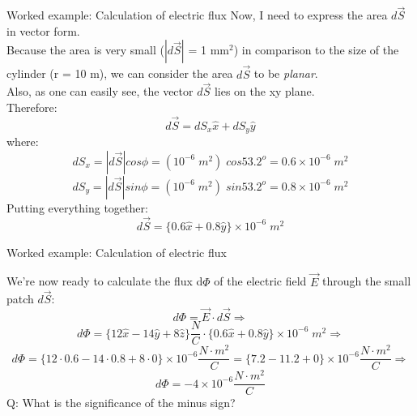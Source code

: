{\begin{frame}{Worked example: Calculation of electric flux}
Now, I need to express the area $d\vec{S}$ in vector form.\\
\vspace{0.2cm}
Because the area is very small ($|d\vec{S}|$ = 1 mm$^2$) in comparison to the
size of the cylinder (r = 10 m), we can consider the area $d\vec{S}$ to be {\em planar}.\\
\vspace{0.1cm}
Also, as one can easily see, the vector $d\vec{S}$ lies on the xy plane.\\
\vspace{0.3cm}
Therefore:
\begin{equation*}
  d\vec{S} = dS_x \hat{x} + dS_y \hat{y}
\end{equation*}
where:
\begin{equation*}
   dS_x = |d\vec{S}| cos\phi = (10^{-6} \; m^2) \; cos53.2^o = 0.6 \times 10^{-6} \; m^2
\end{equation*}
\begin{equation*}
   dS_y = |d\vec{S}| sin\phi = (10^{-6} \; m^2) \; sin53.2^o = 0.8 \times 10^{-6} \; m^2
\end{equation*}
\vspace{0.2cm}
Putting everything together:
\begin{equation*}
  d\vec{S} = \big\{ 0.6 \hat{x} + 0.8 \hat{y} \big\} \times 10^{-6} \; m^2
\end{equation*}

\end{frame}

%
%
%

\begin{frame}{Worked example: Calculation of electric flux}

We're now ready to calculate the flux d$\Phi$ of the electric field $\vec{E}$
through the small patch $d\vec{S}$:\\
\vspace{0.2cm}
\begin{equation*}
  d\Phi = \vec{E} \cdot d\vec{S} \Rightarrow
\end{equation*}
\vspace{0.1cm}
\begin{equation*}
  d\Phi =
  \big\{ 12 \hat{x} - 14 \hat{y} + 8 \hat{z} \big\} \frac{N}{C}
   \cdot \big\{ 0.6 \hat{x} + 0.8 \hat{y} \big\} \times 10^{-6} \; m^2 \Rightarrow
\end{equation*}
\vspace{0.1cm}
\begin{equation*}
  d\Phi =
  \big\{ 12 \cdot 0.6 - 14 \cdot 0.8 + 8 \cdot 0 \big\} \times 10^{-6} \frac{N \cdot m^2}{C} =
  \big\{ 7.2 - 11.2 + 0 \big\} \times 10^{-6} \frac{N \cdot m^2}{C}
  \Rightarrow
\end{equation*}
\vspace{0.1cm}
\begin{equation*}
  d\Phi = -4 \times 10^{-6} \frac{N \cdot m^2}{C}
\end{equation*}
\vspace{0.1cm}
Q: What is the significance of the minus sign?
\end{frame}

} %
